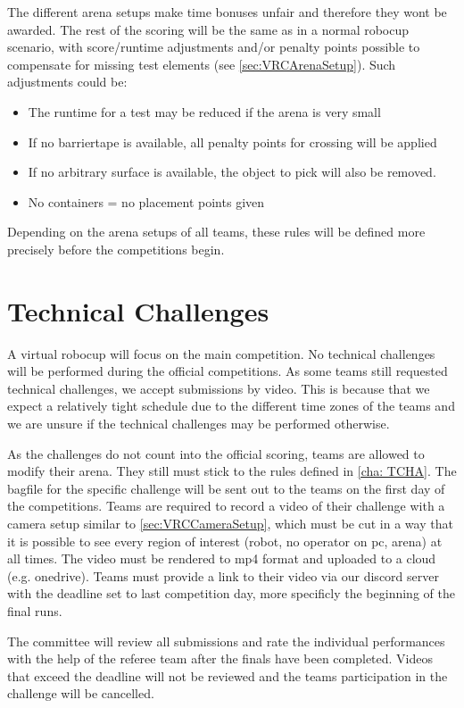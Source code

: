 The different arena setups make time bonuses unfair and therefore they wont be awarded. 
The rest of the scoring will be the same as in a normal robocup scenario, with score/runtime adjustments and/or penalty points possible to compensate for missing test elements (see \ref{sec:VRCArenaSetup}). Such adjustments could be:

\begin{itemize}
\item The runtime for a test may be reduced if the arena is very small
\item If no barriertape is available, all penalty points for crossing will be applied
\item If no arbitrary surface is available, the object to pick will also be removed. 
\item No containers = no placement points given
\end{itemize}

Depending on the arena setups of all teams, these rules will be defined more precisely before the competitions begin.

\section{Technical Challenges} 
\label{sec:VRCTecCha}

A virtual robocup will focus on the main competition. No technical challenges will be performed during the official competitions. As some teams still requested technical challenges, we accept submissions by video. 
This is because that we expect a relatively tight schedule due to the different time zones of the teams and we are unsure if the technical challenges may be performed otherwise.

As the challenges do not count into the official scoring, teams are allowed to modify their arena. They still must stick to the rules defined in \ref{cha: TCHA}. The bagfile for the specific challenge will be sent out to the teams on the first day of the competitions. Teams are required to record a video of their challenge with a camera setup similar to \ref{sec:VRCCameraSetup}, which must be cut in a way that it is possible to see every region of interest (robot, no operator on pc, arena) at all times. The video must be rendered to mp4 format and uploaded to a cloud (e.g. onedrive). 
Teams must provide a link to their video via our discord server with the deadline set to last competition day, more specificly the beginning of the final runs.

The committee will review all submissions and rate the individual performances with the help of the referee team after the finals have been completed. Videos that exceed the deadline will not be reviewed and the teams participation in the challenge will be cancelled.











